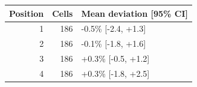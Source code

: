 \begin{tabular}{rrl}
\toprule
Position & Cells & Mean deviation [95\% CI] \\
\midrule
1 & 186 & -0.5\% [-2.4, +1.3] \\
2 & 186 & -0.1\% [-1.8, +1.6] \\
3 & 186 & +0.3\% [-0.5, +1.2] \\
4 & 186 & +0.3\% [-1.8, +2.5] \\
\bottomrule
\end{tabular}
